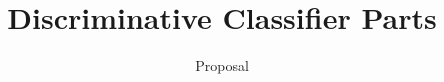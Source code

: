 %
%
%
%
%
%
%
%

\documentclass[12pt,a4paper]{article}               %
      
\usepackage[utf8]{inputenc}
\usepackage{amsmath}
\usepackage{amsfonts}
\usepackage{amssymb}

\usepackage{techrep_icg}




\title{Discriminative Classifier Parts} %
\subtitle{Proposal} %
\repdate{\today}          %

%
%

